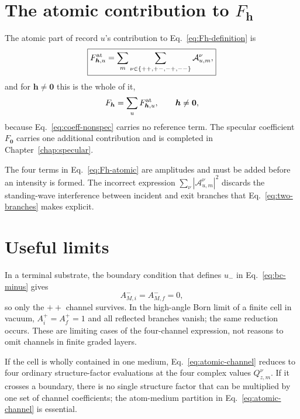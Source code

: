 \section{The atomic contribution to \texorpdfstring{$F_{\bm h}$}{Fh}}

The atomic part of record $u$'s contribution to Eq.~\eqref{eq:Fh-definition} is
\begin{equation}
  \boxed{
  F_{\bm h,u}^{\rm at}
  =\sum_m\sum_{\nu\in\{++,+-,-+,--\}}
   \mathcal A_{u,m}^{\nu},
  }
  \label{eq:Fh-atomic}
\end{equation}
and for $\bm h\neq\bm 0$ this is the whole of it,
\begin{equation}
  F_{\bm h}=\sum_u F_{\bm h,u}^{\rm at},
  \qquad \bm h\neq\bm 0,
  \label{eq:Fh-nonspecular}
\end{equation}
because Eq.~\eqref{eq:coeff-nonspec} carries no reference term.  The specular
coefficient $F_{\bm 0}$ carries one additional contribution and is completed in
Chapter~\ref{chap:specular}.

The four terms in Eq.~\eqref{eq:Fh-atomic} are amplitudes and must be added
before an intensity is formed.  The incorrect expression
$\sum_\nu|\mathcal A_{u,m}^{\nu}|^2$ discards the standing-wave interference
between incident and exit branches that Eq.~\eqref{eq:two-branches} makes
explicit.

\section{Useful limits}

In a terminal substrate, the boundary condition that defines $u_-$ in
Eq.~\eqref{eq:bc-minus} gives
\begin{equation}
  A_{M,i}^{-}=A_{M,f}^{-}=0,
  \label{eq:terminal-branches}
\end{equation}
so only the $++$ channel survives.  In the high-angle Born limit of a finite
cell in vacuum, $A_i^+=A_f^+=1$ and all reflected branches vanish; the same
reduction occurs.  These are limiting cases of the four-channel expression,
not reasons to omit channels in finite graded layers.

If the cell is wholly contained in one medium, Eq.~\eqref{eq:atomic-channel}
reduces to four ordinary structure-factor evaluations at the four complex
values $Q_{z,m}^\nu$.  If it crosses a boundary, there is no single structure
factor that can be multiplied by one set of channel coefficients; the
atom-medium partition in Eq.~\eqref{eq:atomic-channel} is essential.
